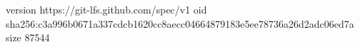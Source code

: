 version https://git-lfs.github.com/spec/v1
oid sha256:c3a996b0671a337cdcb1620cc8aecc04664879183e5ee78736a26d2adc06ed7a
size 87544
